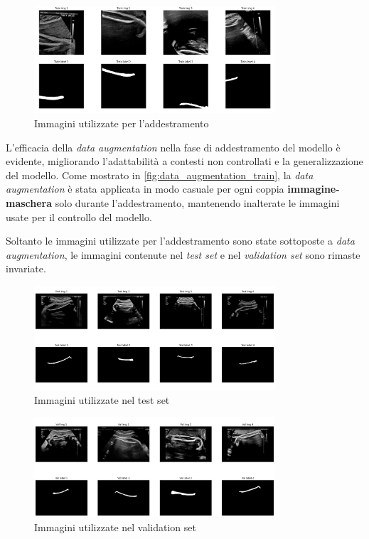 \begin{figure}
    \centering
    \includegraphics[width=0.8\textwidth]{Immagini/data_augmentation_train.png}
    \caption{Immagini utilizzate per l'addestramento}
    \label{fig:data_augmentation_train}
\end{figure}

L'efficacia della \textit{data augmentation} nella fase di addestramento del modello è evidente,
migliorando l'adattabilità a contesti non controllati e la generalizzazione del modello. Come
mostrato in \autoref{fig:data_augmentation_train}, la \textit{data augmentation} è stata applicata in modo
casuale per ogni coppia \textbf{immagine-maschera} solo durante l'addestramento, mantenendo
inalterate le immagini usate per il controllo del modello.

Soltanto le immagini utilizzate per l'addestramento sono state sottoposte a \textit{data augmentation},
le immagini contenute nel \textit{test set} e nel \textit{validation set} sono rimaste invariate.


\begin{figure}
    \centering
    \includegraphics[width=0.8\textwidth]{Immagini/data_augmentation_test.png}
    \caption{Immagini utilizzate nel test set}
    \label{fig:data_augmentation_test}
\end{figure}

\begin{figure}
    \centering
    \includegraphics[width=0.8\textwidth]{Immagini/data_augmentation_val.png}
    \caption{Immagini utilizzate nel validation set}
    \label{fig:data_augmentation_val}
\end{figure}


